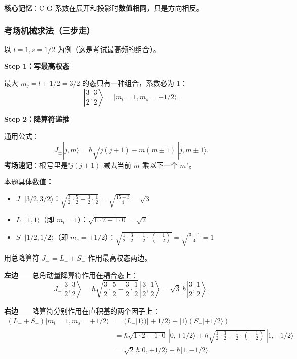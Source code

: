 \textbf{核心记忆}：C-G 系数在展开和投影时\textbf{数值相同}，只是方向相反。

\subsubsection*{考场机械求法（三步走）}

以 $l=1, s=1/2$ 为例（这是考试最高频的组合）。

\textbf{Step 1：写最高权态}

最大 $m_j = l+1/2 = 3/2$ 的态只有一种组合，系数必为 1：
\[
\left|\frac{3}{2}, \frac{3}{2}\right\rangle = |m_l=1, m_s=+1/2\rangle.
\]

\textbf{Step 2：降算符递推}

\begin{tipbox}[升降算符系数速查]
通用公式：
\[
J_\pm |j,m\rangle = \hbar\sqrt{j(j+1)-m(m\pm 1)} \, |j,m\pm 1\rangle.
\]
\textbf{考场速记}：根号里是"$j(j+1)$ 减去当前 $m$ 乘以下一个 $m$"。

本题具体数值：
\begin{itemize}[nosep]
    \item $J_- |3/2, 3/2\rangle$：$\sqrt{\frac{3}{2}\cdot\frac{5}{2} - \frac{3}{2}\cdot\frac{1}{2}} = \sqrt{\frac{15-3}{4}} = \sqrt{3}$
    \item $L_- |1, 1\rangle$（即 $m_l=1$）：$\sqrt{1\cdot 2 - 1\cdot 0} = \sqrt{2}$
    \item $S_- |1/2, 1/2\rangle$（即 $m_s=+1/2$）：$\sqrt{\frac{1}{2}\cdot\frac{3}{2} - \frac{1}{2}\cdot(-\frac{1}{2})} = \sqrt{\frac{3+1}{4}} = 1$
\end{itemize}
\end{tipbox}

用总降算符 $J_- = L_- + S_-$ 作用最高权态两边。

\textbf{左边}——总角动量降算符作用在耦合态上：
\[
J_- \left|\frac{3}{2}, \frac{3}{2}\right\rangle = \hbar\sqrt{\frac{3}{2}\cdot\frac{5}{2} - \frac{3}{2}\cdot\frac{1}{2}} \, \left|\frac{3}{2}, \frac{1}{2}\right\rangle = \sqrt{3}\,\hbar \left|\frac{3}{2}, \frac{1}{2}\right\rangle.
\]

\textbf{右边}——降算符分别作用在直积基的两个因子上：
\begin{align*}
(L_- + S_-) |m_l=1, m_s=+1/2\rangle &= (L_- |1\rangle) |+1/2\rangle + |1\rangle (S_- |+1/2\rangle) \\
&= \hbar\sqrt{1\cdot 2 - 1\cdot 0} \, |0, +1/2\rangle + \hbar\sqrt{\frac{1}{2}\cdot\frac{3}{2} - \frac{1}{2}\cdot(-\frac{1}{2})} \, |1, -1/2\rangle \\
&= \sqrt{2}\,\hbar |0, +1/2\rangle + \hbar |1, -1/2\rangle.
\end{align*}


